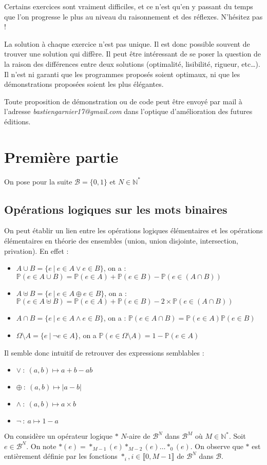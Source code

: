 \documentclass[../main.tex]{subfiles}
\begin{document}
Certains exercices sont vraiment difficiles, et ce n'est qu'en y passant du temps que l'on progresse le plus au niveau du raisonnement et des réflexes. N'hésitez pas !
 
La solution à chaque exercice n'est pas unique. Il est donc possible souvent de trouver une solution qui diffère. Il peut être intéressant de se poser la question de la raison des différences entre deux solutions (optimalité, lisibilité, rigueur, etc\dots). Il n'est ni garanti que les programmes proposés soient optimaux, ni que les démonstrations proposées soient les plus élégantes.

Toute proposition de démonstration ou de code peut être envoyé par mail à l'adresse \textit{bastiengarnier17@gmail.com} dans l'optique d'amélioration des futures éditions.
\section{Première partie}
On pose pour la suite $\mathcal{B} = \{0, 1\}$ et $N\in\mathbb{N}^{*}$
\subsection{Opérations logiques sur les mots binaires}
 On peut établir un lien entre les opérations logiques élémentaires et les opérations élémentaires en théorie des ensembles (union, union disjointe, intersection, privation). En effet :
\begin{itemize}
	\item $A\cup{B} = \{e\ |\ e\in{A}\vee e\in{B}\}$, on a : $\mathbb{P}(e\in A\cup{B}) = \mathbb{P}(e\in A) + \mathbb{P}(e\in B) - \mathbb{P}(e\in (A\cap B))$
	\item $A\uplus{B} = \{e\ |\ e\in{A}\oplus e\in{B}\}$, on a : $\mathbb{P}(e\in A\uplus{B}) = \mathbb{P}(e\in A) + \mathbb{P}(e\in B) - 2\times\mathbb{P}(e\in (A\cap B))$
	\item $A\cap{B} = \{e\ |\ e\in{A}\wedge e\in{B}\}$, on a : $\mathbb{P}(e\in A\cap{B}) = \mathbb{P}(e\in A)\mathbb{P}(e\in B)$
	\item $\Omega\setminus{A} = \{e\ |\ \neg e\in{A}\}$, on a $\mathbb{P}(e\in{\Omega\setminus{A}}) = 1 - \mathbb{P}(e\in{A})$
\end{itemize}
Il semble donc intuitif de retrouver des expressions semblables :
\begin{itemize}
	\item $\vee\ :\ (a, b) \mapsto a + b - ab$
	\item $\oplus\ :\ (a, b) \mapsto |a - b|$
	\item $\wedge\ :\ (a, b) \mapsto a\times b$
	\item $\neg\ :\ a \mapsto 1 - a$
\end{itemize}
On considère un opérateur logique $\ast$ $N$-aire de $\mathcal{B}^{N}$ dans $\mathcal{B}^{M}$ où $M\in{\mathbb{N}^{*}}$. Soit $e\in{\mathcal{B}^{N}}$. On note $\ast(e) = \ast_{M-1}(e)\ast_{M-2}(e)\dots\ast_{0}(e)$. On observe que $\ast$ est entièrement définie par les fonctions $\ast_{i}, i\in{\llbracket0, M-1\rrbracket}$ de $\mathcal{B}^{N}$ dans $\mathcal{B}$.
\end{document}
